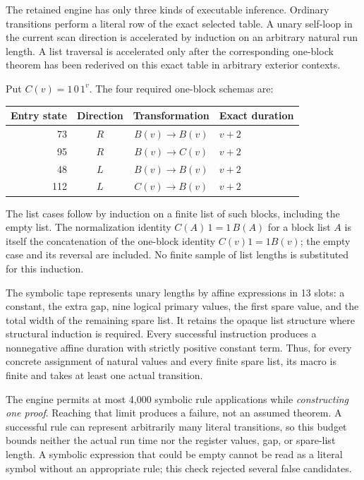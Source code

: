 The retained engine has only three kinds of executable inference.
Ordinary transitions perform a literal row of the exact selected table.
A unary self-loop in the current scan direction is accelerated by
induction on an arbitrary natural run length. A list traversal is
accelerated only after the corresponding one-block theorem has been
rederived on this exact table in arbitrary exterior contexts.

Put $C(v)=1\,0\,1^v$. The four required one-block schemas are:
\begin{center}
\begin{tabular}{rccl}
\toprule
Entry state & Direction & Transformation & Exact duration\\
\midrule
73 & $R$ & $B(v)\to B(v)$ & $v+2$\\
95 & $R$ & $B(v)\to C(v)$ & $v+2$\\
48 & $L$ & $B(v)\to B(v)$ & $v+2$\\
112 & $L$ & $C(v)\to B(v)$ & $v+2$\\
\bottomrule
\end{tabular}
\end{center}
The list cases follow by induction on a finite list of such blocks,
including the empty list. The normalization identity
$C(A)\,1=1\,B(A)$ for a block list $A$ is itself the concatenation of
the one-block identity $C(v)1=1B(v)$; the empty case and its reversal
are included. No finite sample of list lengths is substituted for this
induction.

The symbolic tape represents unary lengths by affine expressions in
13 slots: a constant, the extra gap, nine logical primary values, the
first spare value, and the total width of the remaining spare list.
It retains the opaque list structure where structural induction is
required. Every successful instruction produces a nonnegative affine
duration with strictly positive constant term. Thus, for every concrete
assignment of natural values and every finite spare list, its macro is
finite and takes at least one actual transition.

The engine permits at most 4,000 symbolic rule applications while
\emph{constructing one proof}. Reaching that limit produces a failure,
not an assumed theorem. A successful rule can represent arbitrarily many
literal transitions, so this budget bounds neither the actual run time
nor the register values, gap, or spare-list length. A symbolic expression
that could be empty cannot be read as a literal symbol without an
appropriate rule; this check rejected several false candidates.

